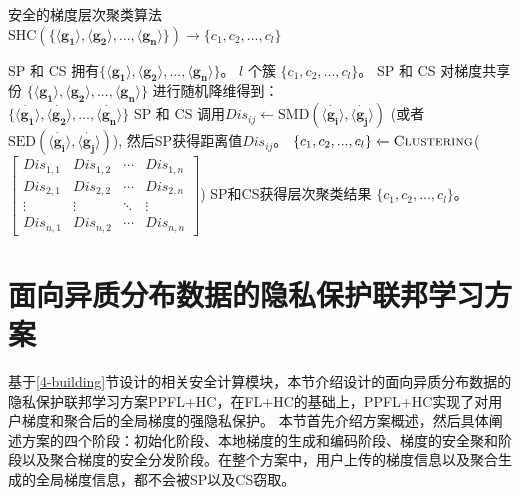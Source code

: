 \begin{algorithm}[htbp]
	\caption{安全的梯度层次聚类算法 \\ $\text{SHC}(\{\boldsymbol{\langle g_1\rangle}, \boldsymbol{\langle g_2\rangle},...,\boldsymbol{\langle g_n\rangle} \}) \rightarrow \{c_1,c_2,...,c_l \}$}
	\label{alg3}
	\begin{algorithmic}[1]
		\REQUIRE SP 和 CS 拥有$\{\boldsymbol{\langle g_1\rangle}, \boldsymbol{\langle g_2\rangle},...,\boldsymbol{\langle g_n\rangle} \}$。 
		\ENSURE $l$ 个簇 $\{c_1,c_2,...,c_l \}$。
		\STATE SP 和 CS 对梯度共享份 $\{\boldsymbol{\langle g_1\rangle}, \boldsymbol{\langle g_2\rangle},...,\boldsymbol{\langle g_n\rangle} \}$ 进行随机降维得到：\\ $\{\dot{\boldsymbol{\langle g_1\rangle}}, \dot{\boldsymbol{\langle g_2\rangle}},...,\dot{\boldsymbol{\langle g_n\rangle}} \}$
			\STATE SP 和 CS 调用$\textit{Dis}_{ij} \xleftarrow{}\text{SMD}(\dot{\boldsymbol{\langle g_i\rangle}}, \dot{\boldsymbol{\langle g_j\rangle}})$ (或者 $\text{SED}(\dot{\boldsymbol{\langle g_i\rangle}}, \dot{\boldsymbol{\langle g_j\rangle}})$), 然后SP获得距离值$\textit{Dis}_{ij}$。
		\ENDFOR
		\ENDFOR
		\STATE $\{c_1,c_2,...,c_l \} \xleftarrow{} \textsc{Clustering}$(\(\begin{bmatrix}
			\textit{Dis}_{1,1} & \textit{Dis}_{1,2} & \cdots & \textit{Dis}_{1,n} \\
			\textit{Dis}_{2,1} & \textit{Dis}_{2,2} & \cdots & \textit{Dis}_{2,n} \\
			\vdots & \vdots & \ddots & \vdots \\
			\textit{Dis}_{n,1} & \textit{Dis}_{n,2} & \cdots & \textit{Dis}_{n,n}
		\end{bmatrix}\)) 
		\RETURN SP和CS获得层次聚类结果 $\{c_1,c_2,...,c_l \}$。
	\end{algorithmic}
\end{algorithm}


\section{面向异质分布数据的隐私保护联邦学习方案}\label{4-framework}
基于\ref{4-building}节设计的相关安全计算模块，本节介绍设计的面向异质分布数据的隐私保护联邦学习方案PPFL+HC，在FL+HC\cite{briggs2020federated}的基础上，PPFL+HC实现了对用户梯度和聚合后的全局梯度的强隐私保护。
本节首先介绍方案概述，然后具体阐述方案的四个阶段：初始化阶段、本地梯度的生成和编码阶段、梯度的安全聚和阶段以及聚合梯度的安全分发阶段。在整个方案中，用户上传的梯度信息以及聚合生成的全局梯度信息，都不会被SP以及CS窃取。


